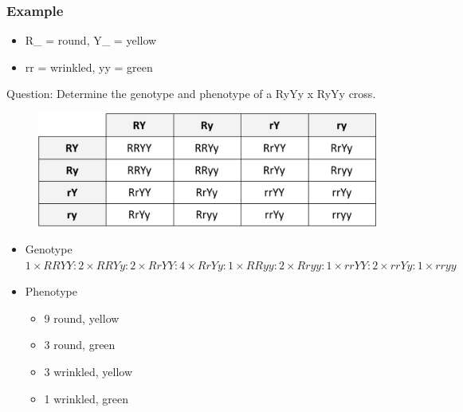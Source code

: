 \documentclass[a4paper,12pt]{article}
\begin{document}
\subsubsection{Example}
\begin{itemize}
    \item{R\_ = round, Y\_ = yellow}
    \item{rr = wrinkled, yy = green}
\end{itemize}

Question: Determine the genotype and phenotype of a RyYy x RyYy cross.

\begin{figure}[H]
    \centering
    \includegraphics[width=\textwidth]{dihybrid}
\end{figure}

\begin{itemize}
    \item{Genotype \\ $1 \times RRYY : 2 \times RRYy : 2 \times RrYY : 4 \times RrYy : 1 \times RRyy : 2 \times Rryy : 1 \times rrYY : 2 \times rrYy : 1 \times rryy$}
    \item{
            Phenotype
            \begin{itemize}
                \item{9 round, yellow}
                \item{3 round, green}
                \item{3 wrinkled, yellow}
                \item{1 wrinkled, green}
            \end{itemize}
        }
\end{itemize}
\end{document}
